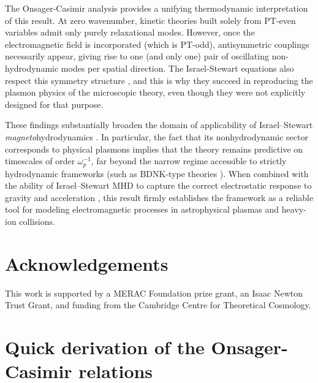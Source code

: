 \documentclass[a4paper, amsfonts, amssymb, amsmath, reprint, showkeys, nofootinbib, twoside,notitlepage,onecolumn]{revtex4-1}
\theoremstyle{definition}
\theoremstyle{theorem}
\begin{document}
The Onsager-Casimir analysis \cite{Onsager_Casimir} provides a unifying thermodynamic interpretation of this result. At zero wavenumber, kinetic theories built solely from PT-even variables admit only purely relaxational modes. However, once the electromagnetic field is incorporated (which is PT-odd), antisymmetric couplings necessarily appear, giving rise to one (and only one) pair of oscillating non-hydrodynamic modes per spatial direction. The Israel-Stewart equations also respect this symmetry structure \cite{GavassinoSymmetric2022nff,GavassinoUniveraalityI2023odx}, and this is why they succeed in reproducing the plasmon physics of the microscopic theory, even though they were not explicitly designed for that purpose.

\newpage
These findings substantially broaden the domain of applicability of Israel–Stewart \textit{magneto}hydrodynamics \cite{Dash:2022xkz,GavassinoShokryMHD:2023qnw}. In particular, the fact that its nonhydrodynamic sector corresponds to physical plasmons implies that the theory remains predictive on timescales of order $\omega_p^{-1}$, far beyond the narrow regime accessible to strictly hydrodynamic frameworks (such as BDNK-type theories \cite{GavassinoThermoelectric2025bnx}). When combined with the ability of Israel–Stewart MHD to capture the correct electrostatic response to gravity and acceleration \cite{Gavassino:2025wcy}, this result firmly establishes the framework as a reliable tool for modeling electromagnetic processes in astrophysical plasmas and heavy-ion collisions.


\section*{Acknowledgements}

This work is supported by a MERAC Foundation prize grant,  an Isaac Newton Trust Grant, and funding from the Cambridge Centre for Theoretical Cosmology.

\appendix
\section{Quick derivation of the Onsager-Casimir relations}\label{apponsager}
\end{document}
